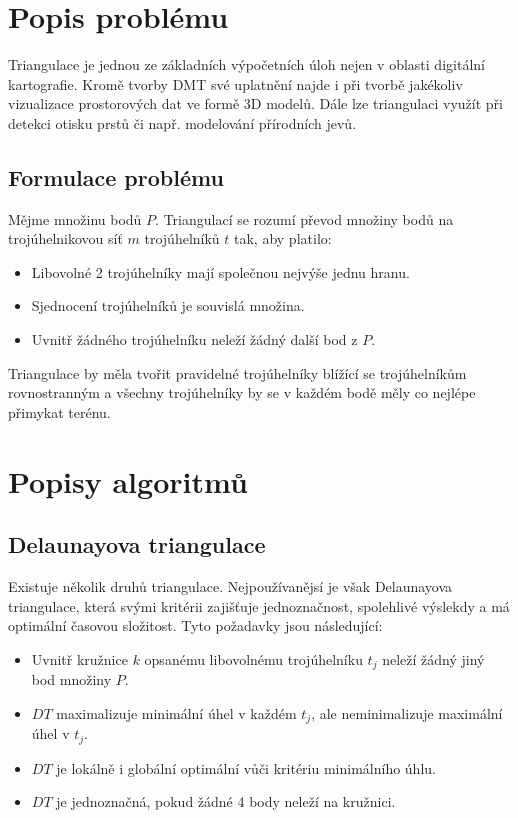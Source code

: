 \documentclass[11pt]{article}
\begin{document}
\section{Popis problému}
Triangulace je jednou ze základních výpočetních úloh nejen v oblasti digitální kartografie. Kromě tvorby DMT své uplatnění najde i při tvorbě jakékoliv vizualizace prostorových dat ve formě 3D modelů. Dále lze triangulaci využít při detekci otisku prstů či např. modelování přírodních jevů.
 
\subsection{Formulace problému}

Mějme množinu bodů $P$. Triangulací se rozumí převod množiny bodů na trojúhelnikovou síť $m$ trojúhelníků $t$ tak, aby platilo:

\begin{itemize}
	\item Libovolné 2 trojúhelníky mají společnou nejvýše jednu hranu.
	\item Sjednocení trojúhelníků je souvislá množina.
	\item Uvnitř žádného trojúhelníku neleží žádný další bod z $P$.	
\end{itemize}

Triangulace by měla tvořit pravidelné trojúhelníky blížící se trojúhelníkům rovnostranným a všechny trojúhelníky by se v každém bodě měly co nejlépe přimykat terénu. 


\section{Popisy algoritmů}
\subsection{Delaunayova triangulace}

Existuje několik druhů triangulace. Nejpoužívanějsí je však Delaunayova triangulace, která svými kritérii zajišťuje jednoznačnost, spolehlivé výslekdy a má optimální časovou složitost. Tyto požadavky jsou následující:

\begin{itemize}
\item Uvnitř kružnice $k$ opsanému libovolnému trojúhelníku $t_{j}$ neleží žádný jiný bod množiny $P$.
\item $DT$ maximalizuje minimální úhel v každém $t_{j}$, ale neminimalizuje maximální úhel v $t_{j}$. 
\item $DT$ je lokálně i globální optimální vůči kritériu minimálního úhlu.
\item $DT$ je jednoznačná, pokud žádné 4 body neleží na kružnici.

\end{itemize}
\end{document}
